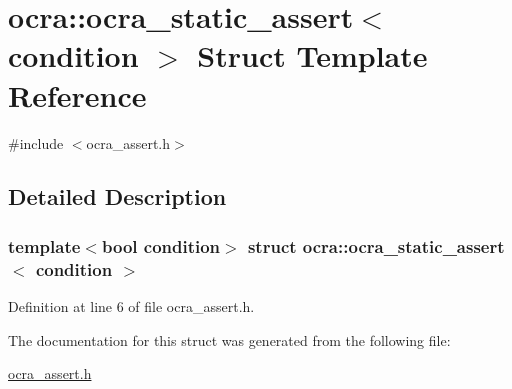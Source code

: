 \hypertarget{structocra_1_1ocra__static__assert}{}\section{ocra\+:\+:ocra\+\_\+static\+\_\+assert$<$ condition $>$ Struct Template Reference}
\label{structocra_1_1ocra__static__assert}


{\ttfamily \#include $<$ocra\+\_\+assert.\+h$>$}



\subsection{Detailed Description}
\subsubsection*{template$<$bool condition$>$\newline
struct ocra\+::ocra\+\_\+static\+\_\+assert$<$ condition $>$}



Definition at line 6 of file ocra\+\_\+assert.\+h.



The documentation for this struct was generated from the following file\+:\begin{DoxyCompactItemize}
\item 
\hyperlink{ocra__assert_8h}{ocra\+\_\+assert.\+h}\end{DoxyCompactItemize}
